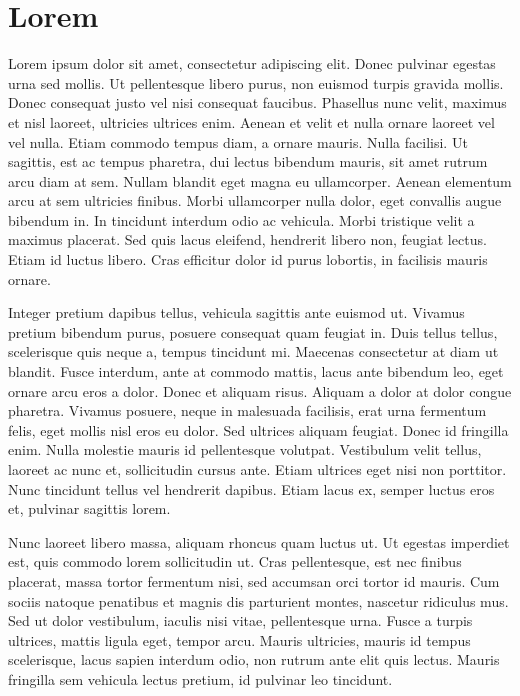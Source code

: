 \appendix

\chapter{Lorem}
Lorem ipsum dolor sit amet, consectetur adipiscing elit. Donec pulvinar egestas urna sed mollis. Ut pellentesque libero purus, non euismod turpis gravida mollis. Donec consequat justo vel nisi consequat faucibus. Phasellus nunc velit, maximus et nisl laoreet, ultricies ultrices enim. Aenean et velit et nulla ornare laoreet vel vel nulla. Etiam commodo tempus diam, a ornare mauris. Nulla facilisi. Ut sagittis, est ac tempus pharetra, dui lectus bibendum mauris, sit amet rutrum arcu diam at sem. Nullam blandit eget magna eu ullamcorper. Aenean elementum arcu at sem ultricies finibus. Morbi ullamcorper nulla dolor, eget convallis augue bibendum in. In tincidunt interdum odio ac vehicula. Morbi tristique velit a maximus placerat. Sed quis lacus eleifend, hendrerit libero non, feugiat lectus. Etiam id luctus libero. Cras efficitur dolor id purus lobortis, in facilisis mauris ornare.

Integer pretium dapibus tellus, vehicula sagittis ante euismod ut. Vivamus pretium bibendum purus, posuere consequat quam feugiat in. Duis tellus tellus, scelerisque quis neque a, tempus tincidunt mi. Maecenas consectetur at diam ut blandit. Fusce interdum, ante at commodo mattis, lacus ante bibendum leo, eget ornare arcu eros a dolor. Donec et aliquam risus. Aliquam a dolor at dolor congue pharetra. Vivamus posuere, neque in malesuada facilisis, erat urna fermentum felis, eget mollis nisl eros eu dolor. Sed ultrices aliquam feugiat. Donec id fringilla enim. Nulla molestie mauris id pellentesque volutpat. Vestibulum velit tellus, laoreet ac nunc et, sollicitudin cursus ante. Etiam ultrices eget nisi non porttitor. Nunc tincidunt tellus vel hendrerit dapibus. Etiam lacus ex, semper luctus eros et, pulvinar sagittis lorem.

Nunc laoreet libero massa, aliquam rhoncus quam luctus ut. Ut egestas imperdiet est, quis commodo lorem sollicitudin ut. Cras pellentesque, est nec finibus placerat, massa tortor fermentum nisi, sed accumsan orci tortor id mauris. Cum sociis natoque penatibus et magnis dis parturient montes, nascetur ridiculus mus. Sed ut dolor vestibulum, iaculis nisi vitae, pellentesque urna. Fusce a turpis ultrices, mattis ligula eget, tempor arcu. Mauris ultricies, mauris id tempus scelerisque, lacus sapien interdum odio, non rutrum ante elit quis lectus. Mauris fringilla sem vehicula lectus pretium, id pulvinar leo tincidunt.
